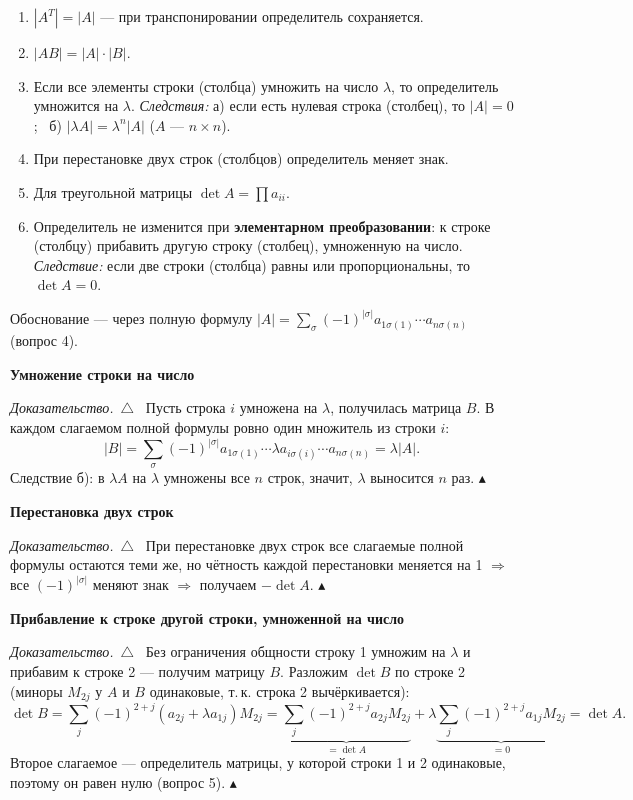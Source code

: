 \documentclass[a4paper,11pt]{article}
\newenvironment{dok}
  {\par\smallskip\noindent\textit{Доказательство.}\ $\triangle$\ \ignorespaces}
  {\unskip\nobreak\hfill$\blacktriangle$\par\smallskip}
\newcommand{\podr}[1]{\par\needspace{8\baselineskip}\medskip
  {\large\bfseries\textcolor{oprc!80!black}{#1}}\par\nopagebreak\smallskip}
\begin{document}
\begin{teo}
\begin{enumerate}[leftmargin=*]
  \item $|A^T| = |A|$ --- при транспонировании определитель сохраняется.
  \item $|AB| = |A| \cdot |B|$.
  \item Если все элементы строки (столбца) умножить на число $\lambda$, то определитель умножится на $\lambda$.
        \emph{Следствия:} а) если есть нулевая строка (столбец), то $|A| = 0$; \ б) $|\lambda A| = \lambda^n |A|$ ($A$ --- $n \times n$).
  \item При перестановке двух строк (столбцов) определитель меняет знак.
  \item Для треугольной матрицы $\det A = \prod a_{ii}$.
  \item Определитель не изменится при \textbf{элементарном преобразовании}: к строке (столбцу) прибавить другую строку (столбец),
        умноженную на число. \emph{Следствие:} если две строки (столбца) равны или пропорциональны, то $\det A = 0$.
\end{enumerate}
\end{teo}

Обоснование --- через полную формулу $|A| = \sum_\sigma (-1)^{|\sigma|} a_{1\sigma(1)} \cdots a_{n\sigma(n)}$ (вопрос 4).

\podr{Умножение строки на число}

\begin{dok}
Пусть строка $i$ умножена на $\lambda$, получилась матрица $B$. В каждом слагаемом полной формулы ровно один множитель из строки $i$:
\[
  |B| = \sum_\sigma (-1)^{|\sigma|} a_{1\sigma(1)} \cdots \lambda a_{i\sigma(i)} \cdots a_{n\sigma(n)} = \lambda |A|.
\]
Следствие б): в $\lambda A$ на $\lambda$ умножены все $n$ строк, значит, $\lambda$ выносится $n$ раз.
\end{dok}

\podr{Перестановка двух строк}

\begin{dok}
При перестановке двух строк все слагаемые полной формулы остаются теми же, но чётность каждой перестановки меняется на 1
$\Rightarrow$ все $(-1)^{|\sigma|}$ меняют знак $\Rightarrow$ получаем $-\det A$.
\end{dok}

\podr{Прибавление к строке другой строки, умноженной на число}

\begin{dok}
Без ограничения общности строку 1 умножим на $\lambda$ и прибавим к строке 2 --- получим матрицу $B$.
Разложим $\det B$ по строке 2 (миноры $M_{2j}$ у $A$ и $B$ одинаковые, т.\,к. строка 2 вычёркивается):
\[
  \det B = \sum_j (-1)^{2+j} (a_{2j} + \lambda a_{1j}) M_{2j}
  = \underbrace{\sum_j (-1)^{2+j} a_{2j} M_{2j}}_{= \det A}
  + \lambda \underbrace{\sum_j (-1)^{2+j} a_{1j} M_{2j}}_{= 0} = \det A.
\]
Второе слагаемое --- определитель матрицы, у которой строки 1 и 2 одинаковые, поэтому он равен нулю (вопрос 5).
\end{dok}
\end{document}
